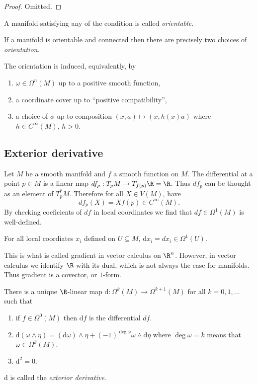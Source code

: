 \documentclass[a4paper]{article}
\newcommand{\w}{\wedge}
\begin{document}
\begin{proof}
  Omitted.
\end{proof}

\begin{definition}[orientability]
  A manifold satisfying any of the condition is called \emph{orientable}.

  If a manifold is orientable and connected then there are precisely two choices of \emph{orientation}.
\end{definition}

The orientation is induced, equivalently, by
\begin{enumerate}
\item \(\omega \in \Omega^n(M)\) up to a positive smooth function,
\item a coordinate cover up to ``positive compatibility'',
\item a choice of \(\phi\) up to composition \((x, a) \mapsto (x, h(x) a)\) where \(h \in C^\infty(M)\), \(h > 0\).
\end{enumerate}

\subsection{Exterior derivative}

Let \(M\) be a smooth manifold and \(f\) a smooth function on \(M\). The differential at a point \(p \in M\) is a linear map \(df_p: T_pM \to T_{f(p)}\R = \R\). Thus \(df_p\) can be thought as an element of \(T_p^*M\). Therefore for all \(X \in V(M)\), have
\[
  df_p(X) = Xf(p) \in C^\infty(M).
\]
By checking coeficients of \(df\) in local coordinates we find that \(df \in \Omega^1(M)\) is well-defined.

\begin{notation}
  For all local coordiates \(x_i\) defined on \(U \subseteq M\), \(\mathrm d x_i = dx_i \in \Omega^1(U)\).
\end{notation}

\begin{remark}
  This is what is called gradient in vector calculus on \(\R^n\). However, in vector calculus we identify \(\R\) with its dual, which is not always the case for manifolds. Thus gradient is a covector, or \(1\)-form.
\end{remark}

\begin{theorem}
  There is a unique \(\R\)-linear map \(\mathrm d: \Omega^k(M) \to \Omega^{k + 1}(M)\) for all \(k = 0, 1, \dots\) such that
  \begin{enumerate}
  \item if \(f \in \Omega^0(M)\) then \(\mathrm d f\) is the differential \(df\).
  \item \(\mathrm d(\omega \w \eta) = (\mathrm d \omega) \w \eta + (-1)^{\deg \omega} \omega \w \mathrm d \eta\) where \(\deg \omega = k\) means that \(\omega \in \Omega^k(M)\).
  \item \(\mathrm d^2 = 0\).
  \end{enumerate}
  \(\mathrm d\) is called the \emph{exterior derivative}.
\end{theorem}
\end{document}
